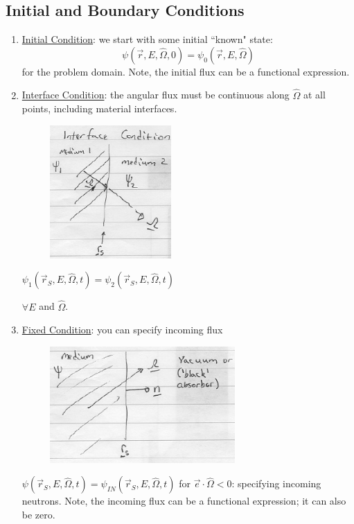\documentclass[12pt]{article}
\newcommand{\vOmega}{\ensuremath{\hat{\Omega}}}
\begin{document}
\subsection*{Initial and Boundary Conditions}
\begin{enumerate}
\item \underline{Initial Condition}: we start with some initial ``known" state:
\[\psi(\vec{r}, E, \vOmega, 0) = \psi_0(\vec{r}, E, \vOmega)\]
for the problem domain. Note, the initial flux can be a functional expression.

\item \underline{Interface Condition}: the angular flux must be continuous along $\vOmega$ at all points, including material interfaces.

\begin{minipage}{0.45\textwidth}
\begin{figure}[H]
\includegraphics[height=2in]{InterfaceCondition}
\end{figure}
\end{minipage} \hfill
\begin{minipage}{0.45\textwidth}
$\psi_1(\vec{r}_S, E, \vOmega, t) = \psi_2(\vec{r}_S, E, \vOmega, t)$

\vspace*{1 em}
$\forall E$ and $\vOmega$.
\end{minipage}

\item \underline{Fixed Condition}: you can specify incoming flux

\begin{minipage}{0.45\textwidth}
\begin{figure}[H]
\includegraphics[height=1.75in]{FreeSurfaceCondition}
\end{figure}
\end{minipage} \hfill
\begin{minipage}{0.45\textwidth}
$\psi(\vec{r}_S, E, \vOmega, t) = \psi_{IN}(\vec{r}_S, E, \vOmega, t)$ for $\vec{e} \cdot \vOmega < 0$: specifying incoming neutrons. Note, the incoming flux can be a functional expression; it can also be zero.


\end{minipage}
\end{enumerate}
\end{document}
